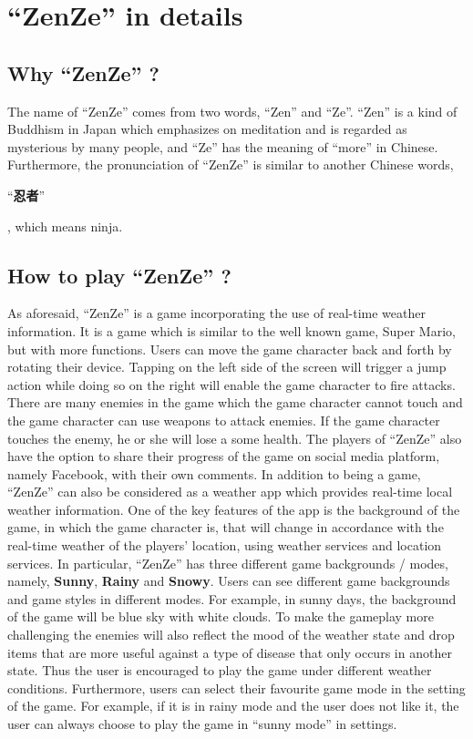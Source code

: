 \documentclass{sigchi}
\begin{document}
\section{``ZenZe'' in details}
\subsection{Why ``ZenZe'' ?}

The name of ``ZenZe'' comes from two words, ``Zen'' and ``Ze''. ``Zen'' is a kind of Buddhism in Japan which emphasizes on meditation and is regarded as mysterious by many people, and ``Ze'' has the meaning of ``more'' in Chinese.  Furthermore, the pronunciation of  ``ZenZe'' is similar to another Chinese words, 
\begin{CJK}{UTF8}{gbsn}
``\textbf{忍者}''
\end{CJK} 
, which means ninja. 

\subsection{How to play ``ZenZe'' ?}

As aforesaid, ``ZenZe'' is a game incorporating the use of real-time weather information. It is a game which is similar to the well known game, Super Mario, but with more functions. Users can move the game character back and forth by rotating their device. Tapping on the left side of the screen will trigger a jump action while doing so on the right will enable the game character to fire attacks. There are many enemies in the game which the game character cannot touch and the game character can use weapons to attack enemies. If the game character touches the enemy, he or she will lose a some health. The players of ``ZenZe'' also have the option to share their progress of the game on social media platform, namely Facebook, with their own comments. 
In addition to being a game, ``ZenZe'' can also be considered as a weather app which provides real-time local weather information. One of the key features of the app is the background of the game, in which the game character is, that will change in accordance with the real-time weather of the players' location, using weather services and location services. In particular, ``ZenZe'' has three different game backgrounds / modes, namely, \textbf{Sunny}, \textbf{Rainy} and \textbf{Snowy}. Users can see different game backgrounds and game styles in different modes. For example, in sunny days, the background of the game will be blue sky with white clouds. To make the gameplay more challenging the enemies will also reflect the mood of the weather state and drop items that are more useful against a type of disease that only occurs in another state. Thus the user is encouraged to play the game under different weather conditions. Furthermore, users can select their favourite game mode in the setting of the game. For example, if it is in rainy mode and the user does not like it, the user can always choose to play the game in ``sunny mode'' in settings. 
\end{document}
